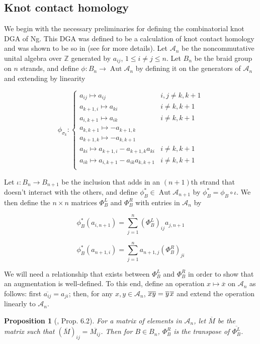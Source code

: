\documentclass[11pt]{amsart}
\def\Z{{\mathbb Z}}
\def\A{{\mathcal A}}
\def\s{{\sigma}}
\newcommand\Aut{\operatorname{Aut}}
\newtheorem{prop}[thm]{Proposition}
\begin{document}
\subsection{Knot contact homology}
\label{SecBG_KCHdef}

  We begin with the necessary preliminaries for defining the combinatorial knot DGA of Ng. This DGA was defined to be a calculation of knot contact homology and was shown to be so in \cite{EENS12} (see \cite{Ng12} for more details). Let $\A_n$ be the noncommutative unital algebra over $\Z$ generated by $a_{ij}$, $1\le i\ne j\le n$.  Let $B_n$ be the braid group on $n$ strands, and define $\phi : B_n \rightarrow\Aut \A_n$ by defining it on the generators of $\A_n$ and extending by linearity

  $$
  \phi_{\s_k}\colon
  \left\{
       \begin{array}{lr}
         a_{ij}\mapsto a_{ij} & i,j\ne k,k+1\\
         a_{k+1,i}\mapsto a_{ki} & i\ne k,k+1\\
         a_{i,k+1}\mapsto a_{ik} & i\ne k,k+1\\
         a_{k,k+1}\mapsto -a_{k+1,k} & \\
         a_{k+1,k}\mapsto -a_{k,k+1} & \\
         a_{ki}\mapsto a_{k+1,i} - a_{k+1,k}a_{ki} & i\ne k,k+1\\
         a_{ik}\mapsto a_{i,k+1} - a_{ik}a_{k,k+1} & i\ne k,k+1\\
       \end{array}
  \right.
  $$

  Let $\iota\colon B_n \rightarrow B_{n+1}$ be the inclusion that adds in an $(n+1)$th strand that doesn't interact with the others, and define $\phi_B^*\in \Aut \A_{n+1}$ by $\phi_B^* = \phi_B\circ\iota$.  We then define the $n\times n$ matrices $\Phi_B^L$ and $\Phi_B^R$ with entries in $\A_n$ by

  $$\phi_B^*(a_{i,n+1}) = \sum_{j=1}^n(\Phi_B^L)_{ij}a_{j,n+1}$$

  $$\phi_B^*(a_{n+1,i}) = \sum_{j=1}^na_{n+1,j}(\Phi_B^R)_{ji}$$

  We will need a relationship that exists between $\Phi_B^L$ and $\Phi_B^R$ in order to show that an augmentation is well-defined. To this end, define an operation $x\mapsto\overline x$ on $\A_n$ as follows: first $\overline{a_{ij}}=a_{ji}$; then, for any $x,y\in\A_n$, $\overline{xy}=\overline y\hspace*{1pt}\overline x$ and extend the operation linearly to $\A_n$.
  \begin{prop}[\cite{Ng05}, Prop.\hspace*{-0.7pt} 6.2]For a matrix of elements in $\A_n$, let $\overline{M}$ be the matrix such that $\left(\overline M\right)_{ij} = \overline{M_{ij}}$. Then for $B\in B_n$, $\Phi_B^R$ is the transpose of $\overline{\Phi_B^L}$.
  \label{Prop:Transpose}
  \end{prop}
\end{document}

